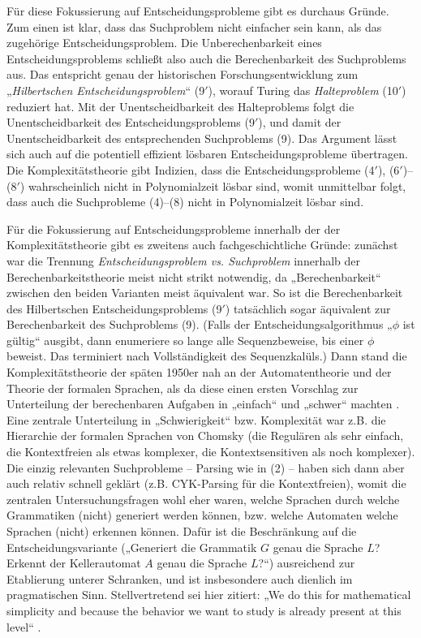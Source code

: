 Für diese Fokussierung auf Entscheidungsprobleme gibt es durchaus Gründe. Zum einen ist klar, dass das Suchproblem nicht einfacher sein kann, als das zugehörige Entscheidungsproblem. Die Unberechenbarkeit eines Entscheidungsproblems schließt also auch die Berechenbarkeit des Suchproblems aus. Das entspricht genau der historischen Forschungsentwicklung zum „\emph{Hilbertschen Entscheidungsproblem}“ (9$'$), worauf Turing das \emph{Halteproblem} (10$'$) reduziert hat. Mit der Unentscheidbarkeit des  Halteproblems folgt die Unentscheidbarkeit des Entscheidungsproblems (9$'$), und damit der Unentscheidbarkeit des entsprechenden Suchproblems (9). 
Das Argument lässt sich auch auf die potentiell effizient lösbaren Entscheidungsprobleme übertragen. Die Komplexitätstheorie gibt Indizien, dass die Entscheidungsprobleme (4$'$), (6$'$)--(8$'$) wahrscheinlich nicht in Polynomialzeit lösbar sind, womit unmittelbar folgt, dass auch die Suchprobleme (4)--(8) nicht in Polynomialzeit lösbar sind.

Für die Fokussierung auf Entscheidungsprobleme innerhalb der der Komplexitätstheorie gibt es zweitens auch fachgeschichtliche Gründe: zunächst war die Trennung \emph{Entscheidungsproblem vs. Suchproblem} innerhalb der Berechenbarkeitstheorie meist nicht strikt notwendig, da „Berechenbarkeit“ zwischen den beiden Varianten meist äquivalent war. So ist die Berechenbarkeit des Hilbertschen Entscheidungsproblems (9$'$) tatsächlich sogar äquivalent zur Berechenbarkeit des Suchproblems (9). (Falls der Entscheidungsalgorithmus „$\phi$ ist gültig“ ausgibt, dann enumeriere so lange alle Sequenzbeweise, bis einer $\phi$ beweist. Das terminiert nach Vollständigkeit des Sequenzkalüls.)
Dann stand die Komplexitätstheorie der späten 1950er nah an der Automatentheorie und der Theorie der formalen Sprachen, als da diese einen ersten Vorschlag zur Unterteilung 
 der berechenbaren Aufgaben in „einfach“ und „schwer“ machten \parencite[vgl.][]{koucky_automata_2023}. Eine zentrale Unterteilung in „Schwierigkeit“ bzw. Komplexität war z.B. die Hierarchie der formalen Sprachen von Chomsky (die Regulären als sehr einfach, die Kontextfreien als etwas komplexer, die Kontextsensitiven als noch komplexer). %
Die einzig relevanten Suchprobleme -- Parsing wie in (2) -- haben sich dann aber auch relativ schnell geklärt (z.B. CYK-Parsing für die Kontextfreien), womit die zentralen Untersuchungsfragen wohl eher waren, welche Sprachen durch welche Grammatiken (nicht) generiert werden können, bzw. welche Automaten welche Sprachen (nicht) erkennen können. Dafür ist die Beschränkung auf die Entscheidungsvariante („Generiert die Grammatik $G$ genau die Sprache $L$? Erkennt der Kellerautomat $A$ genau die Sprache $L$?“) ausreichend zur Etablierung unterer Schranken, und ist insbesondere auch dienlich im pragmatischen Sinn. Stellvertretend sei hier \citeauthor{kozen_automata_1997} zitiert: „We do this for mathematical simplicity and because the behavior we want to study is already present at this level“ \parencite*[7]{kozen_automata_1997}.


